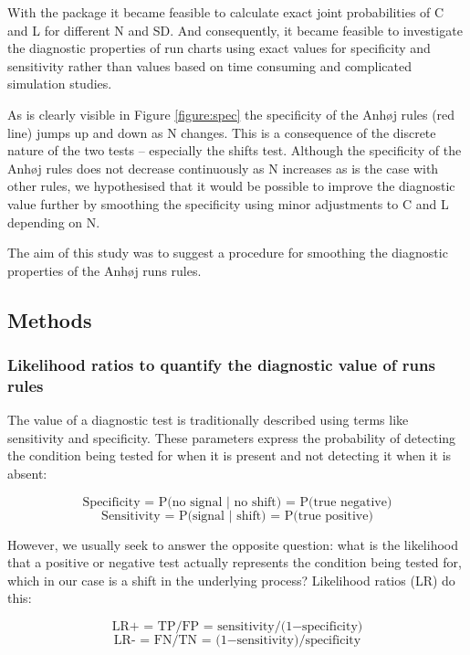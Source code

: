 With the  package it became feasible to calculate
exact joint probabilities of C and L for different N and SD. And
consequently, it became feasible to investigate the diagnostic
properties of run charts using exact values for specificity and
sensitivity rather than values based on time consuming and complicated
simulation studies.

As is clearly visible in Figure \ref{figure:spec} the specificity of the
Anhøj rules (red line) jumps up and down as N changes. This is a
consequence of the discrete nature of the two tests -- especially the
shifts test. Although the specificity of the Anhøj rules does not
decrease continuously as N increases as is the case with other rules, we
hypothesised that it would be possible to improve the diagnostic value
further by smoothing the specificity using minor adjustments to C and L
depending on N.

The aim of this study was to suggest a procedure for smoothing the
diagnostic properties of the Anhøj runs rules.

\hypertarget{methods}{%
\subsection{Methods}\label{methods}}

\hypertarget{likelihood-ratios-to-quantify-the-diagnostic-value-of-runs-rules}{%
\subsubsection{Likelihood ratios to quantify the diagnostic value of
runs
rules}\label{likelihood-ratios-to-quantify-the-diagnostic-value-of-runs-rules}}

The value of a diagnostic test is traditionally described using terms
like sensitivity and specificity. These parameters express the
probability of detecting the condition being tested for when it is
present and not detecting it when it is absent:

\[ \text{Specificity = P(no signal | no shift) = P(true negative}) \]
\[ \text{Sensitivity = P(signal | shift) = P(true positive}) \]

However, we usually seek to answer the opposite question: what is the
likelihood that a positive or negative test actually represents the
condition being tested for, which in our case is a shift in the
underlying process? Likelihood ratios (LR) do this:

\[ \text{LR+ = TP/FP = sensitivity/(1} - \text{specificity)} \]
\[ \text{LR- = FN/TN = (1} - \text{sensitivity)/specificity} \]

